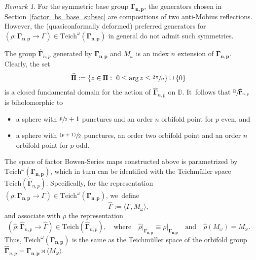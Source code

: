 \documentclass[10pt,a4paper]{amsart}
\newcommand{\psfrac}[2]{\sfrac{(#1)}{#2}}
\let\faktor\sfrac
\theoremstyle{definition}
\theoremstyle{remark}
\newtheorem{remark}[lemma]{Remark}
\newcommand{\D}{\mathbb{D}}
\begin{document}
\begin{remark}
For the symmetric base group $\pmb{\Gamma_{n,p}}$, the generators chosen in Section~\ref{factor_bs_base_subsec} are compositions of two anti-Möbius reflections. However, the (quasiconformally deformed) preferred generators for $(\rho: \pmb{\Gamma_{n,p}}\to\Gamma)\in \mathrm{Teich}^\omega(\pmb{\Gamma_{n,p}})$ in general do not admit such symmetries.
\end{remark}

The group $\widehat{\pmb{\Gamma}}_{n,p}$ generated by $\pmb{\Gamma_{n,p}}$ and $M_\omega$ is an index $n$ extension of $\pmb{\Gamma_{n,p}}$. Clearly, the set
\[
\widehat{\pmb{\Pi}}:=\{ z\in\pmb{\Pi}:\ 0\leq\arg{z}\leq\sfrac{2\pi}{n}\}\cup\{0\}
\]
is a closed fundamental domain for the action of $\widehat{\pmb{\Gamma}}_{n,p}$ on $\D$. It~follows that $\faktor{\D}{\pmb{\widehat{\Gamma}}_{n,p}}$ is biholomorphic to
\begin{itemize}
\item
a sphere with $\sfrac{p}{2}+1$ punctures and an order $n$ orbifold point for $p$ even, and

\item
a sphere with $\psfrac{p+1}{2}$ punctures, an order two orbifold point and an order $n$ orbifold point for $p$ odd.
\end{itemize}

The space of factor Bowen-Series maps constructed above is parametrized by $\mathrm{Teich}^\omega(\pmb{\Gamma_{n,p}})$, which in turn can be identified with the Teichmüller space $\mathrm{Teich}(\widehat{\pmb{\Gamma}}_{n,p})$. Specifically, for the representation $(\rho: \pmb{\Gamma_{n,p}}\to\Gamma)\in \mathrm{Teich}^\omega(\pmb{\Gamma_{n,p}})$, we~define
\[
\widehat{\Gamma}:=\langle\Gamma, M_\omega\rangle,
\]
and associate with $\rho$ the representation
\[
(\widehat{\rho}: \widehat{\pmb{\Gamma}}_{n,p}\to\widehat{\Gamma})\in \mathrm{Teich}(\widehat{\pmb{\Gamma}}_{n,p}),\quad \text{where}\quad \widehat{\rho}\vert_{\pmb{\Gamma_{n,p}}}\equiv\rho\vert_{\pmb{\Gamma_{n,p}}}\quad \text{and}\quad \widehat{\rho}(M_\omega)=M_\omega.
\]
Thus, $\mathrm{Teich}^\omega(\pmb{\Gamma_{n,p}})$ is the same as the Teichmüller space of the orbifold group
$\widehat{\pmb{\Gamma}}_{n,p}=\pmb{\Gamma_{n,p}} \rtimes \langle M_\omega\rangle$.
\end{document}
